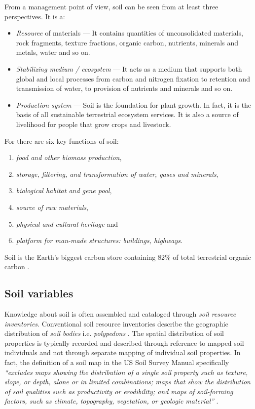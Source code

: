\documentclass[11pt]{krantz}
\theoremstyle{definition}
\theoremstyle{definition}
\theoremstyle{definition}
\theoremstyle{remark}
\begin{document}
From a management point of view, soil can be seen from at least three
perspectives. It is a:

\begin{itemize}
\item
  \emph{Resource} of materials --- It contains quantities of
  unconsolidated materials, rock fragments, texture fractions, organic
  carbon, nutrients, minerals and metals, water and so on.
\item
  \emph{Stabilizing medium / ecosystem} --- It acts as a medium that
  supports both global and local processes from carbon and nitrogen
  fixation to retention and transmission of water, to provision of
  nutrients and minerals and so on.
\item
  \emph{Production system} --- Soil is the foundation for plant growth.
  In fact, it is the basis of all sustainable terrestrial ecosystem
  services. It is also a source of livelihood for people that grow crops
  and livestock.
\end{itemize}

For \citet{frossard2006function} there are six key functions of soil:

\begin{enumerate}
\def\labelenumi{\arabic{enumi}.}
\item
  \emph{food and other biomass production},
\item
  \emph{storage, filtering, and transformation of water, gases and
  minerals},
\item
  \emph{biological habitat and gene pool},
\item
  \emph{source of raw materials},
\item
  \emph{physical and cultural heritage} and
\item
  \emph{platform for man-made structures: buildings, highways}.
\end{enumerate}

Soil is the Earth's biggest carbon store containing 82\% of total
terrestrial organic carbon \citep{Lal2004Science}.

\hypertarget{soil-variables}{%
\subsection{Soil variables}\label{soil-variables}}

Knowledge about soil is often assembled and cataloged through \emph{soil
resource inventories}. Conventional soil resource inventories describe
the geographic distribution of \emph{soil bodies} i.e. \emph{polypedons}
\citep{Wysocki2005Geoderma}. The spatial distribution of soil properties
is typically recorded and described through reference to mapped soil
individuals and not through separate mapping of individual soil
properties. In fact, the definition of a soil map in the US Soil Survey
Manual specifically \emph{``excludes maps showing the distribution of a
single soil property such as texture, slope, or depth, alone or in
limited combinations; maps that show the distribution of soil qualities
such as productivity or erodibility; and maps of soil-forming factors,
such as climate, topography, vegetation, or geologic material''}
\citep{SSDS1993}.
\end{document}
